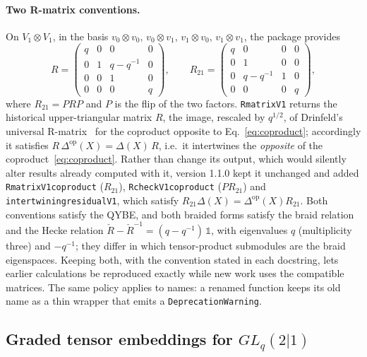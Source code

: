 \documentclass{SciPost}
\newcommand{\code}[1]{\texttt{\begingroup\def\_{\textunderscore\allowbreak}#1\endgroup}}
\newcommand{\GL}{GL_q(2|1)}
\begin{document}
\paragraph{Two R-matrix conventions.} On $V_1\otimes V_1$, in the basis $v_0\otimes v_0,\,v_0\otimes v_1,\,v_1\otimes v_0,\,v_1\otimes v_1$, the package provides
\begin{equation}
R=\begin{pmatrix} q&0&0&0\\ 0&1&q-q^{-1}&0\\ 0&0&1&0\\ 0&0&0&q\end{pmatrix},
\qquad
R_{21}=\begin{pmatrix} q&0&0&0\\ 0&1&0&0\\ 0&q-q^{-1}&1&0\\ 0&0&0&q\end{pmatrix},
\label{eq:rmatrices}
\end{equation}
where $R_{21}=PRP$ and $P$ is the flip of the two factors. \code{R\_matrix\_V1} returns the historical upper-triangular matrix $R$, the image, rescaled by $q^{1/2}$, of Drinfeld's universal R-matrix~\cite{drinfeld1987} for the coproduct opposite to Eq.~\eqref{eq:coproduct}; accordingly it satisfies $R\,\Delta^{\mathrm{op}}(X)=\Delta(X)\,R$, i.e.\ it intertwines the \emph{opposite} of the coproduct~\eqref{eq:coproduct}. Rather than change its output, which would silently alter results already computed with it, version 1.1.0 kept it unchanged and added \code{R\_matrix\_V1\_coproduct} ($R_{21}$), \code{R\_check\_V1\_coproduct} ($PR_{21}$) and \code{intertwining\_residual\_V1}, which satisfy $R_{21}\Delta(X)=\Delta^{\mathrm{op}}(X)R_{21}$. Both conventions satisfy the QYBE, and both braided forms satisfy the braid relation and the Hecke relation $\check R-\check R^{-1}=(q-q^{-1})\,\mathbb{1}$, with eigenvalues $q$ (multiplicity three) and $-q^{-1}$; they differ in which tensor-product submodules are the braid eigenspaces. Keeping both, with the convention stated in each docstring, lets earlier calculations be reproduced exactly while new work uses the compatible matrices. The same policy applies to names: a renamed function keeps its old name as a thin wrapper that emits a \code{DeprecationWarning}.

\subsection{Graded tensor embeddings for \texorpdfstring{$\GL$}{GLq(2|1)}}
\label{sec:graded}
\end{document}
